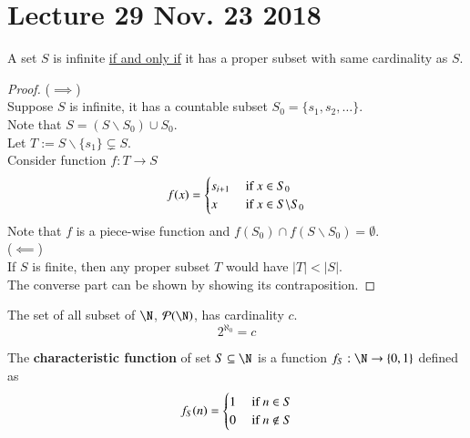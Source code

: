 \documentclass[10pt]{article}
\begin{document}
	\section{Lecture 29 Nov. 23 2018}
		\begin{theorem}
			A set $S$ is infinite \ul{if and only if} it has a proper subset with same cardinality as $S$.
		\end{theorem}
		\begin{proof}
			($\implies$) \\
			Suppose $S$ is infinite, it has a countable subset $S_0 = \{s_1, s_2, \dots\}$.\\
			Note that $S = (S\backslash S_0) \cup S_0$. \\
			Let $T := S \backslash \{s_1\} \subsetneq S$. \\
			Consider function $f:T \to S$
			\[
				f(x) = \begin{cases}
					s_{i+1} &\text{{ if }} x \in S_0 \\
					x &\text{{ if }} x \in S \backslash S_0
				\end{cases}
			\]
			Note that $f$ is a piece-wise function and $f(S_0) \cap f(S\backslash S_0) = \emptyset$. \\
			($\impliedby$) \\
			If $S$ is finite, then any proper subset $T$ would have $|T| < |S|$. \\
			The converse part can be shown by showing its contraposition.
		\end{proof}
		
		\begin{theorem}
			The set of all subset of $\N$, $\mc{P}(\N)$, has cardinality $c$.
			\[
				2^{\aleph_0} = c
			\] 
		\end{theorem}
		
		\begin{definition}
			The \textbf{characteristic function} of set $S \subseteq \N$ is a function $f_S: \N \to \{0,1\}$ defined as 
			\[
				f_S(n) = \begin{cases}
					1 &\text{{ if }} n \in S \\
					0 &\text{{ if }} n \notin S
				\end{cases}
			\]
		\end{definition}
		
\end{document}
